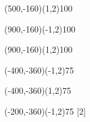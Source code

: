 \documentclass[12pt]{article}
\begin{document}
\begin{figure}[htb]
\begin{egame}
\putbranch(500,-160)(1,2){100}

\renewcommand{\egarrowstyle}{}

\putbranch(900,-160)(-1,2){100}

\renewcommand{\egarrowstyle}{}

\putbranch(900,-160)(1,2){100}




\renewcommand{\egarrowstyle}{}

\putbranch(-400,-360)(-1,2){75}

\renewcommand{\egarrowstyle}{}

\putbranch(-400,-360)(1,2){75}



\renewcommand{\egarrowstyle}{}

\putbranch(-200,-360)(-1,2){75}
[$2$]


\end{egame}
\end{figure}
\end{document}
